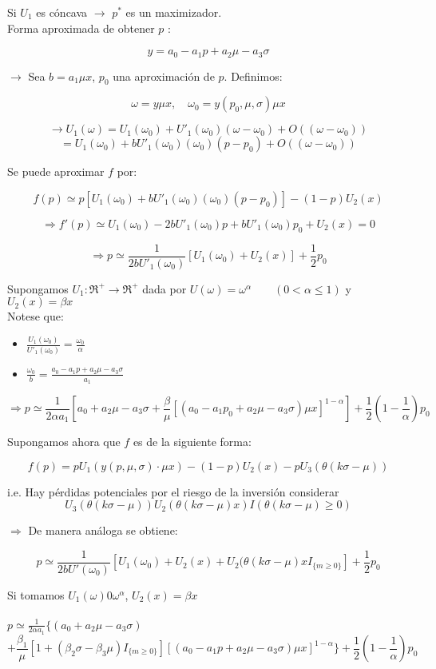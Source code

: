  Si $U_1$ es cóncava $\rightarrow$ $p^*$ es un maximizador.\\

  Forma aproximada de obtener $p$ :

  \[y=a_0-a_1p+a_2\mu-a_3\sigma\]

  $\rightarrow$ Sea $b=a_1\mu x$, $p_0$ una aproximación de $p$. Definimos:

  \[\omega=y\mu x,\quad \omega_0=y(p_0,\mu,\sigma)\mu x\]

  \[\rightarrow U_1(\omega)=U_1(\omega_0)+U'_1(\omega_0)(\omega-\omega_0)+O((\omega-\omega_0))\]
  \[=U_1(\omega_0)+bU'_1(\omega_0)(\omega_0)(p-p_0)+O((\omega-\omega_0))\]

  Se puede aproximar $f$ por:

  \[f(p)\simeq p[U_1(\omega_0)+bU'_1(\omega_0)(\omega_0)(p-p_0)]-(1-p)U_2(x)\]

  \[\Rightarrow f'(p)\simeq U_1(\omega_0)-2bU'_1(\omega_0)p+bU'_1(\omega_0)p_0+U_2(x)=0\]

  \[\Rightarrow p\simeq \frac{1}{2bU'_1(\omega_0)}[U_1(\omega_0)+U_2(x)]+\frac{1}{2}p_0\]

 Supongamos $U_1:\Re^+ \rightarrow \Re^+$ dada por $U(\omega)=\omega^\alpha\qquad(0<\alpha\le1)$ y $U_2(x)=\beta x$\\

 Notese que:
 \begin{itemize}
  \item ${\displaystyle\frac{U_1(\omega_0)}{U'_1(\omega_0)}=\frac{\omega_0}{\alpha}}$
  \item ${\displaystyle\frac{\omega_0}{b}=\frac{a_0-a_1p+a_2\mu-a_3\sigma}{a_1}}$
 \end{itemize}

 \[\Rightarrow p\simeq \frac{1}{2\alpha a_1}[a_0+a_2\mu-a_3\sigma+\frac{\beta}{\mu}[(a_0-a_1p_0+a_2\mu-a_3\sigma)\mu x]^{1-\alpha}]+\frac{1}{2}(1-\frac{1}{\alpha})p_0\]

 Supongamos ahora que $f$ es de la siguiente forma:

 \[f(p)=pU_1(y(p,\mu,\sigma)\cdot \mu x)-(1-p)U_2(x)-pU_3(\theta(k\sigma-\mu))\]

 i.e. Hay pérdidas potenciales por el riesgo de la inversión considerar
 \[U_3(\theta(k\sigma-\mu))U_2(\theta(k\sigma-\mu)x)I(\theta(k\sigma-\mu)\ge 0)\]

 $\Rightarrow$ De manera análoga se obtiene:

 \[p\simeq\frac{1}{2bU'(\omega_0)}[U_1(\omega_0)+U_2(x)+U_2(\theta(k\sigma-\mu)xI_{\{m\ge0\}}]+\frac{1}{2}p_0\]

 \newpage
 Si tomamos $U_1(\omega)0\omega^\alpha$, $U_2(x)=\beta x$ \\\\

 $p\simeq \frac{1}{2\alpha a_1}\{(a_0+a_2\mu-a_3\sigma)$
 \[+\frac{\beta_1}{\mu}[1+(\beta_2\sigma-\beta_3 \mu)I_{\{m\ge0\}}][(a_0-a_1p+a_2\mu-a_3\sigma)\mu x]^{1-\alpha}\}+\frac{1}{2}(1-\frac{1}{\alpha})p_0\]

 